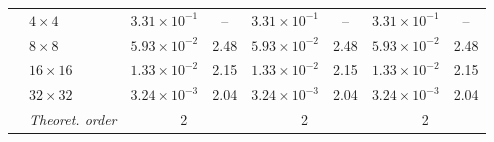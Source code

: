 \documentclass[11pt,a4paper]{article}
\numberwithin{equation}{section}
\theoremstyle{plain}
\theoremstyle{definition}
\theoremstyle{remark}
\begin{document}
\begin{table}[htbp]
\begin{tabular}{llcc|cc|cc}

\addlinespace
\multirow{5}{*}{Pressure}
& $4\times4$   & $3.31\times10^{-1}$ & --
               & $3.31\times10^{-1}$ & --
               & $3.31\times10^{-1}$ & -- \\
& $8\times8$   & $5.93\times10^{-2}$ & 2.48
               & $5.93\times10^{-2}$ & 2.48
               & $5.93\times10^{-2}$ & 2.48 \\
& $16\times16$ & $1.33\times10^{-2}$ & 2.15
               & $1.33\times10^{-2}$ & 2.15
               & $1.33\times10^{-2}$ & 2.15 \\
& $32\times32$ & $3.24\times10^{-3}$ & 2.04
               & $3.24\times10^{-3}$ & 2.04
               & $3.24\times10^{-3}$ & 2.04 \\
& \textit{Theoret. order}
& \multicolumn{2}{c|}{2}
& \multicolumn{2}{c|}{2}
& \multicolumn{2}{c}{2} \\


\bottomrule
\end{tabular}
\end{table}
\end{document}
